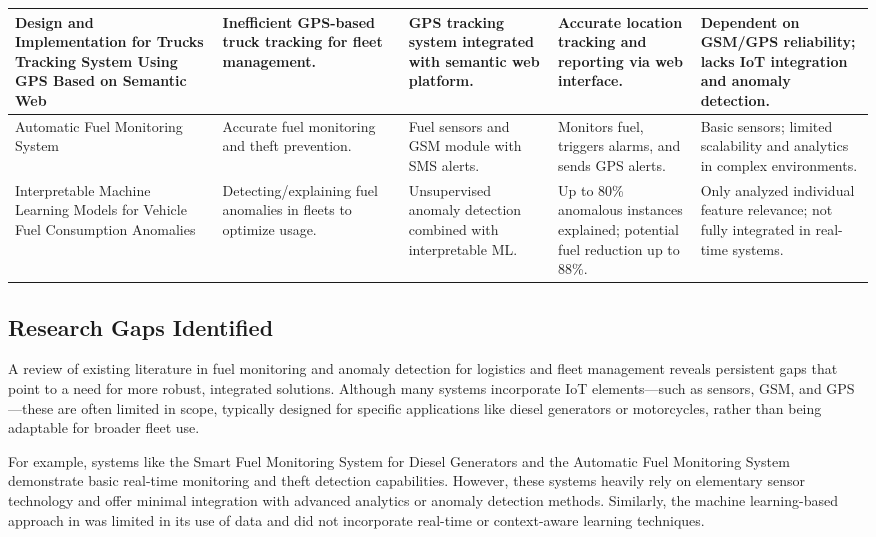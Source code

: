 \begin{SingleSpace}
\begin{longtable}{|p{}|p{}|p{}|p{}|p{}|}
Design and Implementation for Trucks Tracking System Using GPS Based on Semantic Web \cite{nada2017design} &
Inefficient GPS-based truck tracking for fleet management. &
GPS tracking system integrated with semantic web platform. &
Accurate location tracking and reporting via web interface. &
Dependent on GSM/GPS reliability; lacks IoT integration and anomaly detection. \\
\hline

Automatic Fuel Monitoring System \cite{krishnasamy2019} &
Accurate fuel monitoring and theft prevention. &
Fuel sensors and GSM module with SMS\glsadd{SMS} alerts. &
Monitors fuel, triggers alarms, and sends GPS alerts. &
Basic sensors; limited scalability and analytics in complex environments. \\
\hline

Interpretable Machine Learning Models for Vehicle Fuel Consumption Anomalies \cite{barbado2022interpretable} &
Detecting/explaining fuel anomalies in fleets to optimize usage. &
Unsupervised anomaly detection combined with interpretable ML. &
Up to 80\% anomalous instances explained; potential fuel reduction up to 88\%. &
Only analyzed individual feature relevance; not fully integrated in real-time systems. \\
\hline

\end{longtable}
\end{SingleSpace}


\subsection{Research Gaps Identified}



A review of existing literature in fuel monitoring and anomaly detection for logistics and fleet management reveals persistent gaps that point to a need for more robust, integrated solutions. Although many systems incorporate IoT elements—such as sensors, GSM, and GPS—these are often limited in scope, typically designed for specific applications like diesel generators or motorcycles, rather than being adaptable for broader fleet use.

For example, systems like the Smart Fuel Monitoring System for Diesel Generators \cite{tatababu2024smart} and the Automatic Fuel Monitoring System \cite{krishnasamy2019} demonstrate basic real-time monitoring and theft detection capabilities. However, these systems heavily rely on elementary sensor technology and offer minimal integration with advanced analytics or anomaly detection methods. Similarly, the machine learning-based approach in \cite{mumcuoglu2023fuel} was limited in its use of data and did not incorporate real-time or context-aware learning techniques.

